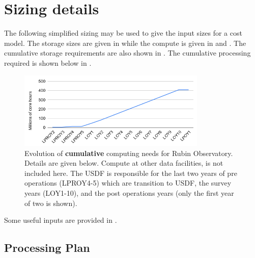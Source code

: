 \section{Sizing details} \label{sec:sizeinputs}

The following simplified sizing may be used to give the input sizes for a
cost model.
The storage sizes are given in 
while the compute is given in 
and . The cumulative storage requirements are also shown
in . The cumulative processing required is shown below
in .

\begin{figure}
\begin{center}
\includegraphics[width=0.8\textwidth]{figs/cores}
\end{center}
\caption{Evolution of {\bf cumulative} computing needs for Rubin Observatory. Details are given below. Compute at other data facilities, is not included here. The \gls{USDF} is responsible for the last two years of pre operations (LPROY4-5) which are transition to \gls{USDF}, the survey years (LOY1-10), and the post operations years (only the first year of two is shown).\label{fig:cores}}
\end{figure}

Some useful inputs are provided in .



\subsection{Processing Plan}

